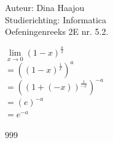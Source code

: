\documentclass[a4paper]{article}
\begin{document}
\noindent \large Auteur: Dina Haajou \\
\noindent \large Studierichting: Informatica \\
\noindent \large Oefeningenreeks 2E nr. 5.2. \\

\medskip

\normalsize

$ \lim\limits_{x \to 0} (1 - x)^{\tfrac{a}{x}} $ \\

$ = \left( (1 - x)^{\tfrac{1}{x}} \right)^a $ \\

$ = \left( (1 + (-x))^{\tfrac{1}{-x}} \right)^{-a} $ \\

$ = (e)^{-a} $ \\

$ = e^{-a} $ \\

\begin{thebibliography}{999}
\end{thebibliography}
\end{document}
